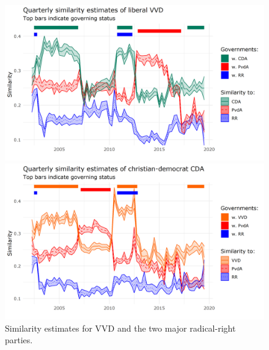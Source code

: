 \documentclass{article}
\begin{document}
\begin{figure}[ht!]
    \hfill
    \begin{minipage}{\textwidth}
    \includegraphics[width=\linewidth]{NL/vis/NL_vvd_sim.png}
    \end{minipage}
    \hfill
    \begin{minipage}{\textwidth}
    \includegraphics[width=\linewidth]{NL/vis/NL_cda_sim.png}
    \end{minipage}
    \caption{Similarity estimates for VVD and the two major radical-right parties.}
    \label{fig:nl_CR}
\end{figure}
\end{document}
